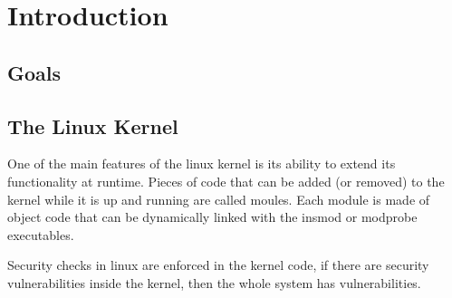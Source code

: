\section{Introduction}




\subsection{Goals}




\subsection{The Linux Kernel}


One of the main features of the linux kernel is its ability to extend 
its functionality at runtime. Pieces of code that can be added (or removed) to the kernel 
while it is up and running are called moules. Each module is made of object code that can 
be dynamically linked with the insmod or modprobe executables\cite{ldd3}. 

Security checks in linux are enforced in the kernel code, if there are security vulnerabilities inside
the kernel, then the whole system has vulnerabilities.\cite{ldd3}






